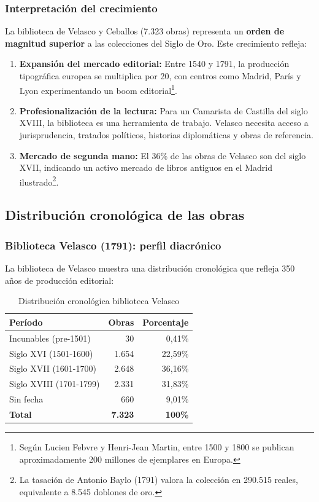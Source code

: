 \documentclass[12pt,a4paper]{article}
\begin{document}
\subsubsection{Interpretación del crecimiento}

La biblioteca de Velasco y Ceballos (7.323 obras) representa un \textbf{orden de magnitud superior} a las colecciones del Siglo de Oro. Este crecimiento refleja:

\begin{enumerate}
\item \textbf{Expansión del mercado editorial:} Entre 1540 y 1791, la producción tipográfica europea se multiplica por 20, con centros como Madrid, París y Lyon experimentando un boom editorial\footnote{Según Lucien Febvre y Henri-Jean Martin, entre 1500 y 1800 se publican aproximadamente 200 millones de ejemplares en Europa.}.

\item \textbf{Profesionalización de la lectura:} Para un Camarista de Castilla del siglo XVIII, la biblioteca es una herramienta de trabajo. Velasco necesita acceso a jurisprudencia, tratados políticos, historias diplomáticas y obras de referencia.

\item \textbf{Mercado de segunda mano:} El 36\% de las obras de Velasco son del siglo XVII, indicando un activo mercado de libros antiguos en el Madrid ilustrado\footnote{La tasación de Antonio Baylo (1791) valora la colección en 290.515 reales, equivalente a 8.545 doblones de oro.}.
\end{enumerate}

\subsection{Distribución cronológica de las obras}

\subsubsection{Biblioteca Velasco (1791): perfil diacrónico}

La biblioteca de Velasco muestra una distribución cronológica que refleja 350 años de producción editorial:

\begin{table}[h]
\centering
\begin{tabular}{lrr}
\toprule
\textbf{Período} & \textbf{Obras} & \textbf{Porcentaje} \\
\midrule
Incunables (pre-1501) & 30 & 0,41\% \\
Siglo XVI (1501-1600) & 1.654 & 22,59\% \\
Siglo XVII (1601-1700) & 2.648 & 36,16\% \\
Siglo XVIII (1701-1799) & 2.331 & 31,83\% \\
Sin fecha & 660 & 9,01\% \\
\midrule
\textbf{Total} & \textbf{7.323} & \textbf{100\%} \\
\bottomrule
\end{tabular}
\caption{Distribución cronológica biblioteca Velasco}
\end{table}
\end{document}
